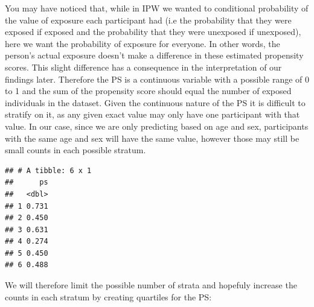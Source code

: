 \documentclass[
]{book}
\newenvironment{Shaded}{\begin{snugshade}}{\end{snugshade}}
\newcommand{\KeywordTok}[1]{\textcolor[rgb]{0.13,0.29,0.53}{\textbf{#1}}}
\newcommand{\NormalTok}[1]{#1}
\newcommand{\OperatorTok}[1]{\textcolor[rgb]{0.81,0.36,0.00}{\textbf{#1}}}
\newcommand{\StringTok}[1]{\textcolor[rgb]{0.31,0.60,0.02}{#1}}
\begin{document}
You may have noticed that, while in IPW we wanted to conditional probability of the value of exposure each participant had (i.e the probability that they were exposed if exposed and the probability that they were unexposed if unexposed), here we want the probability of exposure for everyone. In other words, the person's actual exposure doesn't make a difference in these estimated propensity scores. This slight difference has a consequence in the interpretation of our findings later. Therefore the PS is a continuous variable with a possible range of 0 to 1 and the sum of the propensity score should equal the number of exposed individuals in the dataset. Given the continuous nature of the PS it is difficult to stratify on it, as any given exact value may only have one participant with that value. In our case, since we are only predicting based on age and sex, participants with the same age and sex will have the same value, however those may still be small counts in each possible stratum.

\begin{Shaded}
\end{Shaded}

\begin{verbatim}
## # A tibble: 6 x 1
##      ps
##   <dbl>
## 1 0.731
## 2 0.450
## 3 0.631
## 4 0.274
## 5 0.450
## 6 0.488
\end{verbatim}

We will therefore limit the possible number of strata and hopefuly increase the counts in each stratum by creating quartiles for the PS:
\end{document}

